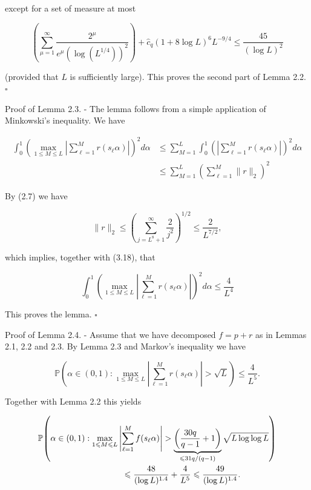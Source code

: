 \documentclass[10pt]{article}
\newcommand{\1}{\mathbf{1}}
\begin{document}
except for a set of measure at most

$$
\left(\sum_{\mu=1}^{\infty} \frac{2^{\mu}}{e^{\mu}\left(\log \left(L^{1 / 4}\right)\right)^{2}}\right)+\hat{c}_{q}(1+8 \log L)^{6} L^{-9 / 4} \leqslant \frac{45}{(\log L)^{2}}
$$

(provided that $L$ is sufficiently large). This proves the second part of Lemma 2.2. \(\square\)

Proof of Lemma 2.3. - The lemma follows from a simple application of Minkowski's inequality. We have


\begin{align*}
\int_{0}^{1}\left(\max _{1 \leqslant M \leqslant L}\left|\sum_{\ell=1}^{M} r\left(s_{\ell} \alpha\right)\right|\right)^{2} d \alpha & \leqslant \sum_{M=1}^{L} \int_{0}^{1}\left(\left|\sum_{\ell=1}^{M} r\left(s_{\ell} \alpha\right)\right|\right)^{2} d \alpha \\
& \leqslant \sum_{M=1}^{L}\left(\sum_{\ell=1}^{M}\|r\|_{2}\right)^{2} \tag{3.18}
\end{align*}


By (2.7) we have

$$
\|r\|_{2} \leqslant\left(\sum_{j=L^{8}+1}^{\infty} \frac{2}{j^{2}}\right)^{1 / 2} \leqslant \frac{2}{L^{7 / 2}},
$$

which implies, together with (3.18), that

$$
\int_{0}^{1}\left(\max _{1 \leqslant M \leqslant L}\left|\sum_{\ell=1}^{M} r\left(s_{\ell} \alpha\right)\right|\right)^{2} d \alpha \leqslant \frac{4}{L^{4}}
$$

This proves the lemma. \(\square\)

Proof of Lemma 2.4. - Assume that we have decomposed $f=p+r$ as in Lemmas 2.1, 2.2 and 2.3. By Lemma 2.3 and Markov's inequality we have

$$
\mathbb{P}\left(\alpha \in(0,1): \max _{1 \leqslant M \leqslant L}\left|\sum_{\ell=1}^{M}r(s_\ell\alpha)\right|>\sqrt{L}\right) \leqslant \frac{4}{L^{5}} .
$$

Together with Lemma 2.2 this yields

\[
\begin{aligned}
&\mathbb{P}\!\left(
 \alpha\in(0,1):
 \max_{1\leqslant M\leqslant L}
 \left|\sum_{\ell=1}^M f(s_\ell\alpha)\right|
 >\underbrace{\left(\frac{30q}{q-1}+1\right)}_{\leqslant31q/(q-1)}
 \sqrt{L\log\log L}
\right)\\
&\hspace{35mm}\leqslant
 \frac{48}{(\log L)^{1.4}}+\frac{4}{L^5}
 \leqslant\frac{49}{(\log L)^{1.4}}.
\end{aligned}
\]
\end{document}
